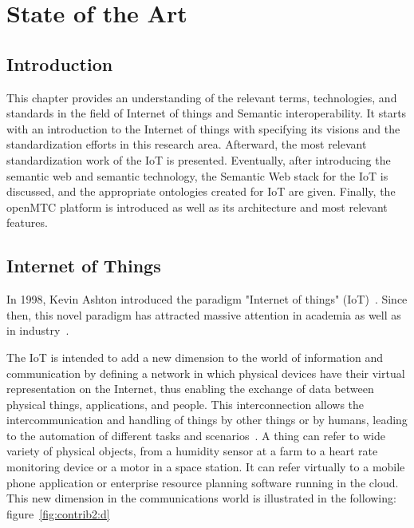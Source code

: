 \cleardoublepage
{}




\chapter{State of the Art}\label{sec:sota}\minitoc\vspace{.5cm}

\section{Introduction}
This chapter provides an understanding of the relevant terms, technologies, and standards in the field of Internet of things and Semantic interoperability. It starts with an introduction to the Internet of things with specifying its visions and the standardization efforts in this research area. Afterward, the most relevant standardization work of the IoT is presented. Eventually, after introducing the semantic web and semantic technology, the Semantic Web stack for the IoT is discussed, and the appropriate ontologies created for IoT are given. Finally, the openMTC platform is introduced as well as its architecture and most relevant features.

\section{Internet of Things}

In 1998, Kevin Ashton introduced the paradigm "Internet of things" (IoT)~\cite{bookiot}. Since then, this novel paradigm has attracted massive attention in academia as well as in industry~\cite{hindi}. \par
The IoT is intended to add a new dimension to the world of information and communication by defining a network in which physical devices have their virtual representation on the Internet, thus enabling the exchange of data between physical things, applications, and people. This interconnection allows the intercommunication and handling of things by other things or by humans, leading to the automation of different tasks and scenarios~\cite{gazi}. A thing can refer to wide variety of physical objects, from a humidity sensor at a farm to a heart rate monitoring device or a motor in a space station. It can refer virtually to a mobile phone application or enterprise resource planning software running in the cloud. This new dimension in the communications world is illustrated in the following: figure~\ref{fig:contrib2:d}

